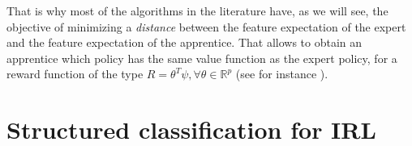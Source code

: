 \documentclass{article}
\begin{document}
That is why most of the algorithms in the literature have, as we will see, the objective of minimizing a \textit{distance}  between the feature expectation of the expert and the feature expectation of the apprentice. That allows to obtain an apprentice which policy has the same value function as the expert policy, for a reward function of the type $R=\theta^T\psi,\forall \theta\in\mathbb{R}^p$ (see for instance \cite{neu2009training}).
\section{Structured classification for IRL}
\end{document}
